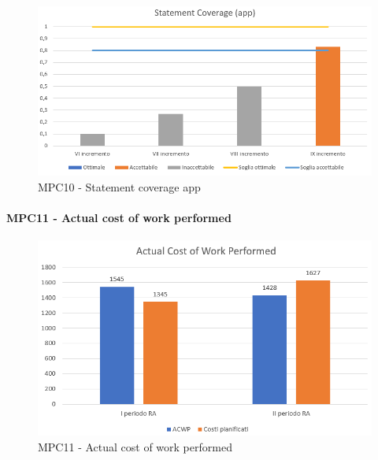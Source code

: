   \begin{figure}[h!]
    \centering
      \includegraphics[scale=1]{Immagini/StatCov APPA.PNG}
    \caption{MPC10 - Statement coverage app}
  \end{figure}



  \clearpage
  \paragraph{MPC11 - Actual cost of work performed}
  \begin{figure}[h!]
    \centering
      \includegraphics[scale=1]{Immagini/ACWPA.PNG}
    \caption{MPC11 -  Actual cost of work performed}
  \end{figure}



  
  \clearpage
